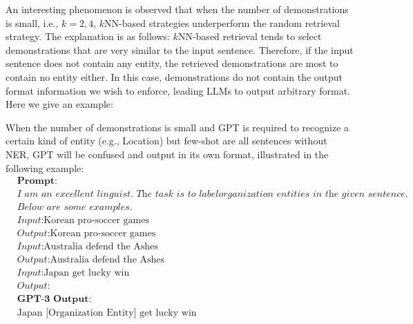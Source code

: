 \documentclass{article}
\begin{document}
An interesting phenomenon is observed that when the number of demonstrations is small, i.e., $k=2,4$,
$k$NN-based strategies underperform the random retrieval strategy.
The explanation is as follows: $k$NN-based retrieval tends to select demonstrations that are very similar to the input sentence.
Therefore, 
 if the input sentence does not contain any entity, the retrieved demonstrations are most to contain no entity either.
 In this case, demonstrations do not contain the output format information we wish to enforce, leading LLMs to output arbitrary format.
 Here we give an example:
 
When the number of demonstrations is small and GPT is required to recognize a certain kind of entity (e.g., Location) but few-shot are all sentences without NER, GPT will be confused and output in its own format, illustrated in the following example:
\begin{equation}
\nonumber
    \begin{aligned}
    	&\textbf{Prompt:}\\
    	&\textit{I am an excellent linguist. The task is to label} \textit{organization entities in the given sentence.}\\
    	&\textit{Below are some examples.} \\
    	&\textit{Input:}\text{Korean pro-soccer games}\\
    	&\textit{Output:}\text{Korean pro-soccer games}\\
    	&\textit{Input:}\text{Australia defend the Ashes}\\
    	&\textit{Output:}\text{Australia defend the Ashes}\\
    	&\textit{Input:}\text{Japan get lucky win}\\
    	&\textit{Output:}\\
    	&\textbf{GPT-3 Output:}\\
    	&\text{Japan [Organization Entity] get lucky win}
    \end{aligned}
\end{equation}

%
\end{document}
